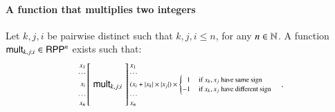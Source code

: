 \paragraph{A function that multiplies two integers}
Let $k,j,i$ be pairwise distinct such that $k,j,i\leq n$, for any $ n\in\mathbb{N} $.
A function $ \mathsf{mult}_{k,j;i}\in\mathsf{RPP}^n  $ exists such that:
\begin{align*}
\arraycolsep=1.4pt
\begin{array}{rcl}
\left. {\scriptsize 
	\begin{array}{r} 
	x_1\\ \cdots 
	\\[1.10mm]
	x_i
	\\[1.25mm] 
	\cdots \\
	x_n
	\end{array}} 
\right[
& \rprMult_{k,j;i} &
\left] {\scriptsize 
	\begin{array}{l}
	x_1\\ \cdots 
	\\[-1mm]
	  (x_i + |x_k| \times |x_j| ) \times
	  \begin{cases}
	  \phantom{-}1  & \textrm{ if } x_k, x_j \textrm{ have same sign}\\
	  -1  &\textrm{ if } x_k, x_j \textrm{ have different sign}
	  \end{cases}
	\\[-1mm]
	\cdots \\ x_n
	\end{array} 
} 
\right.
\enspace.
\end{array}
\end{align*}

